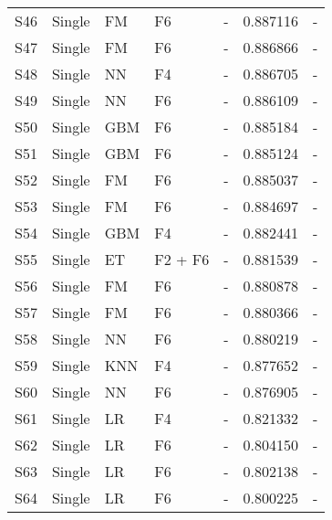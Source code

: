 \begin{table*}
\begin{center}
\begin{minipage}{\textwidth}
{\begin{tabular}{lllllll}
S46 	& Single	& FM		& F6					& - 						& 0.887116	& - \\
S47	& Single	& FM		& F6					& - 						& 0.886866	& - \\
S48	& Single	& NN		& F4					& - 						& 0.886705	& - \\
S49	& Single	& NN		& F6					& - 						& 0.886109	& - \\
S50 	& Single	& GBM		& F6					& - 						& 0.885184	& - \\
S51 	& Single	& GBM		& F6					& - 						& 0.885124	& - \\
S52 	& Single	& FM		& F6					& - 						& 0.885037	& - \\
S53	& Single	& FM		& F6					& - 						& 0.884697	& - \\
S54 	& Single	& GBM		& F4					& - 						& 0.882441	& - \\
S55	& Single	& ET			& F2 + F6				& - 						& 0.881539	& - \\
S56	& Single	& FM		& F6					& - 						& 0.880878	& - \\
S57	& Single	& FM		& F6					& - 						& 0.880366	& - \\
S58	& Single	& NN		& F6					& - 						& 0.880219	& - \\
S59	& Single	& KNN		& F4					& - 						& 0.877652	& - \\
S60	& Single	& NN		& F6					& - 						& 0.876905	& - \\
S61	& Single	& LR			& F4					& - 						& 0.821332	& - \\
S62	& Single	& LR			& F6					& - 						& 0.804150	& - \\
S63	& Single	& LR			& F6					& - 						& 0.802138	& - \\
S64	& Single	& LR			& F6					& - 						& 0.800225	& - \\
\end{tabular}
    }
    \hfill{}
    \label{tb:singleModels}
    \end{minipage}
\end{center}
\end{table*}

